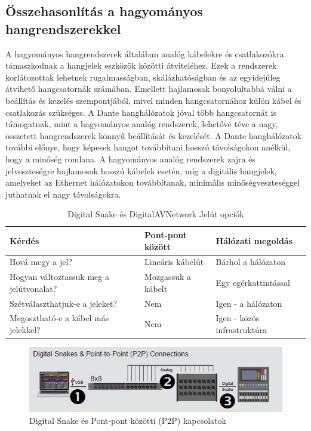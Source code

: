 \subsection{Összehasonlítás a hagyományos hangrendszerekkel}
A hagyományos hangrendszerek általában analóg kábelekre és csatlakozókra
támaszkodnak a hangjelek eszközök közötti átviteléhez. Ezek a rendszerek
korlátozottak lehetnek rugalmasságban, skálázhatóságban és az egyidejűleg
átvihető hangcsatornák számában. Emellett hajlamosak bonyolultabbá válni a
beállítás és kezelés szempontjából, mivel minden hangcsatornához külön kábel és
csatlakozás szükséges. A Dante hanghálózatok jóval több hangcsatornát is támogatnak,
mint a hagyományos analóg rendszerek, lehetővé téve a nagy, összetett hangrendszerek könnyű
beállítását és kezelését. A Dante hanghálózatok további előnye, hogy képesek
hangot továbbítani hosszú távolságokon anélkül, hogy a minőség romlana. A
hagyományos analóg rendszerek zajra és jelveszteségre hajlamosak hosszú kábelek
esetén, míg a digitális hangjelek, amelyeket az Ethernet hálózatokon
továbbítanak, minimális minőségveszteséggel juthatnak el nagy távolságokra.
\begin{table}[htbp]
    \centering
    \caption{Digital Snake és DigitalAVNetwork Jelút opciók}
    \begin{tabular}{@{}lll@{}}
        \toprule
        \textbf{Kérdés} & \textbf{Pont-pont között} & \textbf{Hálózati megoldás} \\ \midrule
        Hová megy a jel? & Lineáris kábelút & Bárhol a hálózaton \\
        Hogyan változtassuk meg a jelútvonalat? & Mozgassuk a kábelt & Egy egérkattintással \\
        Szétválaszthatjuk-e a jeleket? & Nem & Igen - a hálózaton \\
        Megosztható-e a kábel más jelekkel? & Nem & Igen - közös infrastruktúra \\
        \bottomrule
    \end{tabular}
    \label{tab:digital-snake-vs-digitalavnetwork-hu}
\end{table}
\begin{figure}[H]
	\centering
	\includegraphics[width=\linewidth, keepaspectratio]{figures/dsnake-p2p.jpg}
	\caption{Digital Snake és Pont-pont közötti (P2P) kapcsolatok}
	\label {fig:dsnake-p2p}
\end{figure}
